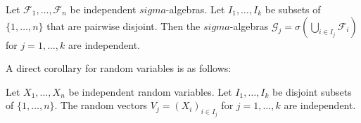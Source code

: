 \begin{proposition}
Let $\mathcal{F}_1, \ldots, \mathcal{F}_n$ be independent $sigma$-algebras. Let $I_1, \ldots, I_k$ be subsets of $\{1, \ldots, n\}$ that are pairwise disjoint. Then the $sigma$-algebras $\mathcal{G}_j = \sigma(\bigcup_{i \in I_j} \mathcal{F}_i)$ for $j=1, \ldots, k$ are independent.
\end{proposition}
A direct corollary for random variables is as follows:%
\begin{theorem}[Corollary]
Let $X_1, \ldots, X_n$ be independent random variables. Let $I_1, \ldots, I_k$ be disjoint subsets of $\{1, \ldots, n\}$. The random vectors $V_j = (X_i)_{i \in I_j}$ for $j=1, \ldots, k$ are independent.
\end{theorem}%
